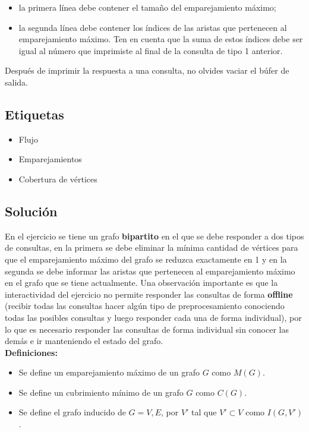 \documentclass{article}
\begin{document}
\begin{itemize}
    \item la primera línea debe contener el tamaño del emparejamiento máximo;
    \item la segunda línea debe contener los índices de las aristas que pertenecen al emparejamiento máximo. Ten en cuenta que la suma de estos índices debe ser igual al número que imprimiste al final de la consulta de tipo 1 anterior.
\end{itemize}

Después de imprimir la respuesta a una consulta, no olvides vaciar el búfer de salida.

\subsection{Etiquetas}

\begin{itemize}
    \item Flujo
    \item Emparejamientos
    \item Cobertura de vértices
\end{itemize}


\subsection{Solución}

En el ejercicio se tiene un grafo \textbf{bipartito} en el que se debe responder a dos tipos de consultas, en la primera
se debe eliminar la mínima cantidad de vértices para que el emparejamiento máximo del grafo se reduzca exactamente en 1 y
en la segunda se debe informar las aristas que pertenecen al emparejamiento máximo en el grafo que se tiene actualmente.
Una observación importante es que la interactividad del ejercicio no permite responder las consultas de forma \textbf{offline}
(recibir todas las consultas hacer algún tipo de preprocesamiento conociendo todas las posibles consultas y luego responder
cada una de forma individual), por lo que es necesario responder las consultas de forma individual sin conocer las demás e ir
manteniendo el estado del grafo.\\

\textbf{Definiciones:}

\begin{itemize}
    \item Se define un emparejamiento máximo de un grafo $G$ como $M(G)$.
    \item Se define un cubrimiento mínimo de un grafo $G$ como $C(G)$.
    \item Se define el grafo inducido de $G=V,E$, por $V'$ tal que $V'\subset V$ como $I(G,V')$.
\end{itemize}
\end{document}
